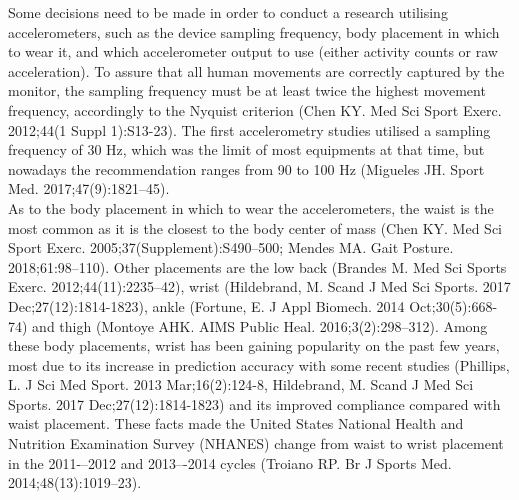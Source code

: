 \documentclass[11pt]{article}
\begin{document}
Some decisions need to be made in order to conduct a research utilising accelerometers, such as the device sampling frequency, body placement in which to wear it, and which accelerometer output to use (either activity counts or raw acceleration). To assure that all human movements are correctly captured by the monitor, the sampling frequency must be at least twice the highest movement frequency, accordingly to the Nyquist criterion {\tiny (Chen KY. Med Sci Sport Exerc. 2012;44(1 Suppl 1):S13-23)}. The first accelerometry studies utilised a sampling frequency of 30 Hz, which was the limit of most equipments at that time, but nowadays the recommendation ranges from 90 to 100 Hz {\tiny (Migueles JH. Sport Med. 2017;47(9):1821–45)}. \\

As to the body placement in which to wear the accelerometers, the waist is the most common as it is the closest to the body center of mass {\tiny (Chen KY. Med Sci Sport Exerc. 2005;37(Supplement):S490–500; Mendes MA. Gait Posture. 2018;61:98–110)}. Other placements are the low back {\tiny (Brandes M. Med Sci Sports Exerc. 2012;44(11):2235–42)}, wrist {\tiny (Hildebrand, M. Scand J Med Sci Sports. 2017 Dec;27(12):1814-1823)}, ankle {\tiny (Fortune, E. J Appl Biomech. 2014 Oct;30(5):668-74)} and thigh {\tiny (Montoye AHK. AIMS Public Heal. 2016;3(2):298–312)}. Among these body placements, wrist has been gaining popularity on the past few years, most due to its increase in prediction accuracy with  some recent studies {\tiny (Phillips, L. J Sci Med Sport. 2013 Mar;16(2):124-8, Hildebrand, M. Scand J Med Sci Sports. 2017 Dec;27(12):1814-1823)} and its improved compliance compared with waist placement. These facts made the United States National Health and Nutrition Examination Survey (NHANES) change from waist to wrist placement in the 2011-–2012 and 2013–-2014 cycles {\tiny (Troiano RP. Br J Sports Med. 2014;48(13):1019–23)}. \\
\end{document}
